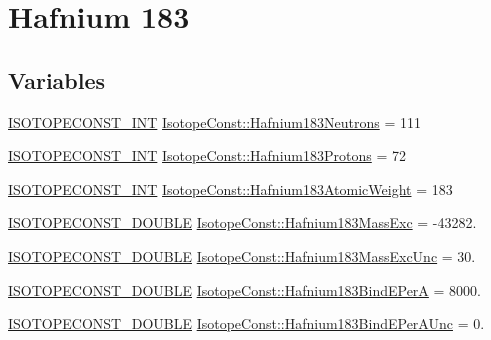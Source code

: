 \hypertarget{group___isotope_const-_hafnium-_hf183}{}\section{Hafnium 183}
\label{group___isotope_const-_hafnium-_hf183}
\subsection*{Variables}
\begin{DoxyCompactItemize}
\item 
\mbox{\hyperlink{group___isotope_const-_macros_ga5f18360b3e99483a35c32d789e62621c}{I\+S\+O\+T\+O\+P\+E\+C\+O\+N\+S\+T\+\_\+\+I\+NT}} \mbox{\hyperlink{group___isotope_const-_hafnium-_hf183_gaa370b5322bfa941c31ff3f50ebccbbd7}{Isotope\+Const\+::\+Hafnium183\+Neutrons}} = 111
\item 
\mbox{\hyperlink{group___isotope_const-_macros_ga5f18360b3e99483a35c32d789e62621c}{I\+S\+O\+T\+O\+P\+E\+C\+O\+N\+S\+T\+\_\+\+I\+NT}} \mbox{\hyperlink{group___isotope_const-_hafnium-_hf183_ga83c83e0ab268aa7c3084e62d62188c3b}{Isotope\+Const\+::\+Hafnium183\+Protons}} = 72
\item 
\mbox{\hyperlink{group___isotope_const-_macros_ga5f18360b3e99483a35c32d789e62621c}{I\+S\+O\+T\+O\+P\+E\+C\+O\+N\+S\+T\+\_\+\+I\+NT}} \mbox{\hyperlink{group___isotope_const-_hafnium-_hf183_gaa4c6c24cf2503d7237d85395d166800b}{Isotope\+Const\+::\+Hafnium183\+Atomic\+Weight}} = 183
\item 
\mbox{\hyperlink{group___isotope_const-_macros_ga8f45a7272ce02c0b4c65c44636ed719a}{I\+S\+O\+T\+O\+P\+E\+C\+O\+N\+S\+T\+\_\+\+D\+O\+U\+B\+LE}} \mbox{\hyperlink{group___isotope_const-_hafnium-_hf183_ga64b0e600d5e19cb06a7758327fc78f4d}{Isotope\+Const\+::\+Hafnium183\+Mass\+Exc}} = -\/43282.
\item 
\mbox{\hyperlink{group___isotope_const-_macros_ga8f45a7272ce02c0b4c65c44636ed719a}{I\+S\+O\+T\+O\+P\+E\+C\+O\+N\+S\+T\+\_\+\+D\+O\+U\+B\+LE}} \mbox{\hyperlink{group___isotope_const-_hafnium-_hf183_ga336be5e631040ed662168ffa95ceb25b}{Isotope\+Const\+::\+Hafnium183\+Mass\+Exc\+Unc}} = 30.
\item 
\mbox{\hyperlink{group___isotope_const-_macros_ga8f45a7272ce02c0b4c65c44636ed719a}{I\+S\+O\+T\+O\+P\+E\+C\+O\+N\+S\+T\+\_\+\+D\+O\+U\+B\+LE}} \mbox{\hyperlink{group___isotope_const-_hafnium-_hf183_ga8ce579826e9519f533134e6b02a2548d}{Isotope\+Const\+::\+Hafnium183\+Bind\+E\+PerA}} = 8000.
\item 
\mbox{\hyperlink{group___isotope_const-_macros_ga8f45a7272ce02c0b4c65c44636ed719a}{I\+S\+O\+T\+O\+P\+E\+C\+O\+N\+S\+T\+\_\+\+D\+O\+U\+B\+LE}} \mbox{\hyperlink{group___isotope_const-_hafnium-_hf183_ga7d87490b56843a87b885524c1f50de05}{Isotope\+Const\+::\+Hafnium183\+Bind\+E\+Per\+A\+Unc}} = 0.

\end{DoxyCompactItemize}
